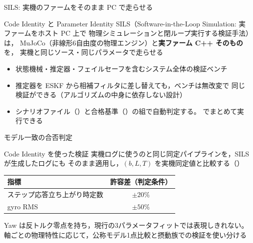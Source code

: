 \begin{frame}{SILS: 実機のファームをそのまま PC で走らせる}
  \begin{block}{Code Identity と Parameter Identity}\small
    SILS（Software-in-the-Loop Simulation: 実ファームをホスト PC 上で
    物理シミュレーションと閉ループ実行する検証手法）は，
    MuJoCo（非線形6自由度の物理エンジン）と\textbf{実ファーム C++ そのもの}を，
    実機と同じソース・同じパラメータで走らせる
  \end{block}

  \vspace{0.5em}

  \begin{itemize}\small
    \item 状態機械・推定器・フェイルセーフを含むシステム全体の検証ベンチ
    \item 推定器を ESKF から相補フィルタに差し替えても，ベンチは無改変で
          同じ検証ができる（アルゴリズムの中身に依存しない設計）
    \item シナリオファイル（）と合格基準（）の組で自動判定する。
           でまとめて実行できる
  \end{itemize}
\end{frame}

\begin{frame}{モデル一致の合否判定}
  \begin{block}{Code Identity を使った検証}\small
    実機ログに使うのと同じ同定パイプラインを，SILS が生成したログにも
    そのまま適用し，$(b, L, T)$ を実機同定値と比較する（）
  \end{block}

  \vspace{0.5em}

  \begin{table}
    \centering\footnotesize
    \begin{tabular}{lc}
      \hline
      \textbf{指標} & \textbf{許容差（判定条件）} \\
      \hline
      ステップ応答立ち上がり時定数 & $\pm20\%$ \\
      gyro RMS & $\pm50\%$ \\
      \hline
    \end{tabular}
  \end{table}

  {\footnotesize Yaw は反トルク零点を持ち，現行の3パラメータフィットでは表現しきれない。
  軸ごとの物理特性に応じて，公称モデル1点比較と摂動族での検証を使い分ける}
\end{frame}

